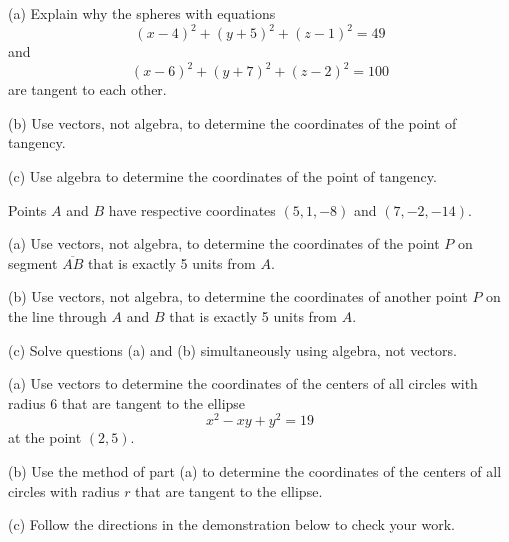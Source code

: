 \documentclass{ximera}
\begin{document}
\begin{question} \label{Q45340:Vectors}
(a) Explain why the spheres with equations
\[
   (x-4)^2 + (y+5)^2 + (z-1)^2 = 49
\]
and
\[
    (x-6)^2 + (y+7)^2 + (z-2)^2 = 100
\]
are tangent to each other.

(b) Use vectors, not algebra, to determine the coordinates of the point of tangency.

(c) Use algebra to determine the coordinates of the point of tangency.

\end{question}


\begin{question} \label{Q45323240:Vectors}
Points $A$ and $B$ have respective coordinates $(5,1,-8)$ and $(7,-2,-14)$. 

(a) Use vectors, not algebra, to determine the coordinates of the point $P$ on segment $\overline{AB}$ that is exactly 5 units from $A$.

(b) Use vectors, not algebra, to determine the coordinates of another point $P$ on the line through $A$ and $B$ that is exactly 5 units from $A$.

(c) Solve questions (a) and (b) simultaneously using algebra, not vectors.

\end{question}


\begin{question} \label{Q4df8240:Vectors}
(a) Use vectors to determine the coordinates of the centers of all circles with radius 6 that are tangent to the ellipse
\[
    x^2 - xy + y^2 = 19
\]
at the point $(2,5)$.

(b) Use the method of part (a) to determine the coordinates of the centers of all circles with radius $r$ that are tangent to the ellipse.

(c) Follow the directions in the demonstration below to check your work.

 
\begin{onlineOnly}
    \begin{center}
\end{center}
\end{onlineOnly}

\end{question}
\end{document}
